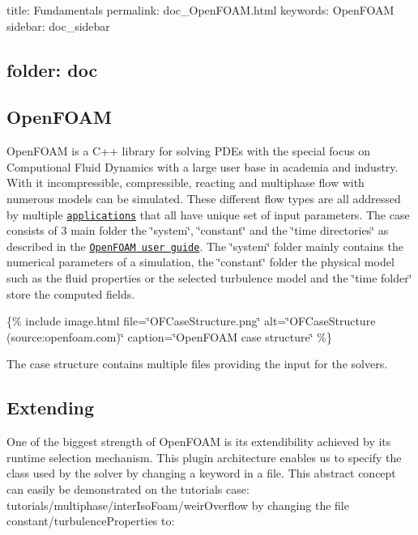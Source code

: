 

 title\+: Fundamentals permalink\+: doc\+\_\+\+Open\+F\+O\+A\+M.\+html keywords\+: Open\+F\+O\+AM sidebar\+: doc\+\_\+sidebar \subsection*{folder\+: doc }

\subsection*{Open\+F\+O\+AM}

Open\+F\+O\+AM is a C++ library for solving P\+D\+Es with the special focus on Computional Fluid Dynamics with a large user base in academia and industry. With it incompressible, compressible, reacting and multiphase flow with numerous models can be simulated. These different flow types are all addressed by multiple \href{https://www.openfoam.com/documentation/user-guide/a-reference/a.1-standard-solvers}{\tt applications} that all have unique set of input parameters. The case consists of 3 main folder the \char`\"{}system\char`\"{}, \char`\"{}constant\char`\"{} and the \char`\"{}time directories\char`\"{} as described in the \href{https://www.openfoam.com/documentation/user-guide/2-openfoam-cases/2.1-file-structure-of-openfoam-cases}{\tt Open\+F\+O\+AM user guide}. The \char`\"{}system\char`\"{} folder mainly contains the numerical parameters of a simulation, the \char`\"{}constant\char`\"{} folder the physical model such as the fluid properties or the selected turbulence model and the \char`\"{}time folder\char`\"{} store the computed fields.

\{\% include image.\+html file=\char`\"{}\+O\+F\+Case\+Structure.\+png\char`\"{} alt=\char`\"{}\+O\+F\+Case\+Structure (source\+:openfoam.\+com)\char`\"{} caption=\char`\"{}\+Open\+F\+O\+A\+M case structure\char`\"{} \%\}

The case structure contains multiple files providing the input for the solvers.

\subsection*{Extending}

One of the biggest strength of Open\+F\+O\+AM is its extendibility achieved by its runtime selection mechanism. This plugin architecture enables us to specify the class used by the solver by changing a keyword in a file. This abstract concept can easily be demonstrated on the tutorials case\+: tutorials/multiphase/inter\+Iso\+Foam/weir\+Overflow by changing the file constant/turbulence\+Properties to\+:


